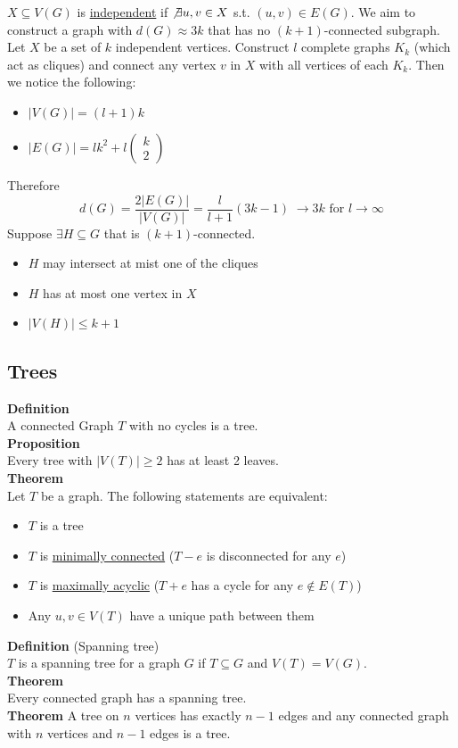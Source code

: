 \documentclass[a4paper, 12pt]{article}
\begin{document}
	$X\subseteq V(G)$ is \underline{independent} if $\not\exists u,v \in X$ s.t. $(u,v) \in E(G)$. We aim to construct a graph with $d(G) \approx 3k$ that has no $(k+1)$-connected subgraph. Let $X$ be a set of $k$ independent vertices. Construct $l$ complete graphs $K_k$ (which act as cliques) and connect any vertex $v$ in $X$ with all vertices of each $K_k$. Then we notice the following: \begin{itemize}
		\item $\left|V(G)\right| = (l+1)k$
		\item $\left|E(G)\right| = lk^2 + l\begin{pmatrix}
			k\\2
		\end{pmatrix}$
	\end{itemize}
	Therefore \[d(G) = \frac{2\left|E(G)\right|}{\left|V(G)\right|} = \frac{l}{l+1}(3k-1) \; \to 3k \text{ for } l \to \infty\]
	Suppose $\exists H \subseteq G$ that is $(k+1)$-connected. \begin{itemize}
		\item $H$ may intersect at mist one of the cliques
		\item $H$ has at most one vertex in $X$
		\item $\left|V(H)\right| \leq k+1$
	\end{itemize}
	\subsection{Trees}
	\textbf{Definition}\\
	A connected Graph $T$ with no cycles is a tree.\\
	\textbf{Proposition}\\
	Every tree with $\left|V(T)\right| \geq 2$ has at least 2 leaves.\\
	\textbf{Theorem}\\
	Let $T$ be a graph. The following statements are equivalent:\begin{itemize}
		\item $T$ is a tree
		\item $T$ is \underline{minimally connected} ($T-e$ is disconnected for any $e$)
		\item $T$ is \underline{maximally acyclic} ($T+e$ has a cycle for any $e \notin E(T)$)
		\item Any $u,v \in V(T)$ have a unique path between them
	\end{itemize}
	\textbf{Definition} (Spanning tree)\\
	$T$ is a spanning tree for a graph $G$ if $T\subseteq G$ and $V(T) = V(G)$.\\
	\textbf{Theorem}\\
	Every connected graph has a spanning tree.\\
	\textbf{Theorem}
	A tree on $n$ vertices has exactly $n-1$ edges and any connected graph with $n$ vertices and $n-1$ edges is a tree.
\end{document}
